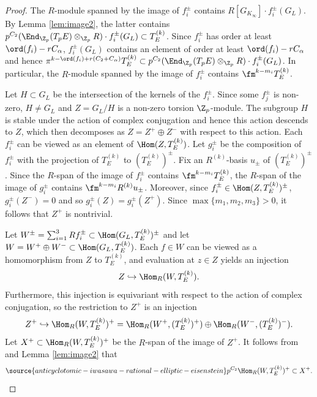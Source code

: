 \begin{proof}
The $R$-module spanned by the image of $f_i^\pm$ contains $R[G_{K_\infty}]\cdot f_i^\pm(G_L)$.
By Lemma \ref{lem:image2}, the latter contains $p^{C_2}(\End_{\Z_p}(T_pE)\otimes_{\Z_p}R)\cdot f_i^\pm(G_L) \subset T_E^{(k)}$.
Since $f_i^\pm$ has order at least $\ord(f_i) - rC_\alpha$, $f_i^\pm(G_L)$ contains an element of order at least
$\ord(f_i) - rC_\alpha$ and hence $\pi^{k-\ord(f_i) + r(C_2+C_\alpha)} T_E^{(k)}\subset
p^{C_2}(\End_{\Z_p}(T_pE)\otimes_{\Z_p}R)\cdot f_i^\pm(G_L)$.
In particular, the $R$-module spanned by the image of $f_i^\pm$ contains
$\fm^{k-m_i} T_E^{(k)}$.


Let $H \subset G_L$ be the intersection of the kernels of the $f_i^\pm$. Since some $f_j^\pm$ is non-zero, $H\neq G_L$
and $Z = G_L/H$ is a non-zero torsion $\Z_p$-module. The subgroup $H$ is stable under the action of complex conjugation and hence this action descends to $Z$, which then decomposes as $Z = Z^+ \oplus Z^-$ with respect to this action.
Each $f_i^\pm$ can be viewed as an element of $\Hom(Z,T_E^{(k)})$.
Let $g_i^\pm$ be the composition of $f_i^\pm$ with the projection of $T_E^{(k)}$ to $(T_E^{(k)})^\pm$.
Fix an $R^{(k)}$-basis $u_\pm$ of $(T_E^{(k)})^\pm$. Since the $R$-span of the image of $f_i^\pm$ contains
$\fm^{k-m_i} T_E^{(k)}$, the $R$-span of the image of $g_i^\pm$ contains $\fm^{k-m_i}R^{(k)} u_\pm$.
Moreover, since $f_i^\pm \in \Hom(Z,T_E^{(k)})^\pm$, $g^\pm_i(Z^-)=0$ and so $g_i^\pm(Z) = g_i^\pm(Z^+)$.
Since $\max\{m_1,m_2,m_3\}>0$, it follows that $Z^+$ is nontrivial.

Let $W^\pm = \sum_{i=1}^3 Rf_i^\pm \subset \Hom(G_L,T_E^{(k)})^\pm$ and let
$W = W^+\oplus W^- \subset \Hom(G_L,T_E^{(k)})$.
Each $f\in W$ can be viewed as a homomorphism from
$Z$ to $T_E^{(k)}$, and evaluation at $z\in Z$ yields an injection
$$
Z\hookrightarrow \Hom_R(W,T_E^{(k)}).
$$
Furthermore, this injection is equivariant with respect to the action of complex conjugation, so
the restriction to $Z^+$ is an injection
$$
Z^+ \hookrightarrow \Hom_R(W,T_E^{(k)})^+ = \Hom_R(W^+,(T_E^{(k)})^+)\oplus \Hom_R(W^-,(T_E^{(k)})^-).
$$
Let $X^+\subset \Hom_R(W,T_E^{(k)})^+$ be the $R$-span of the image of $Z^+$. It follows
from \cite[Cor.~(6.3.4)]{nekovar} and Lemma \ref{lem:image2} that
\begin{equation}\label{eq:spanimage}
\source{anticyclotomic-iwasawa-rational-elliptic-eisenstein}
p^{C_2} \Hom_R(W,T_E^{(k)})^+\subset X^+.
\end{equation}


\end{proof}

